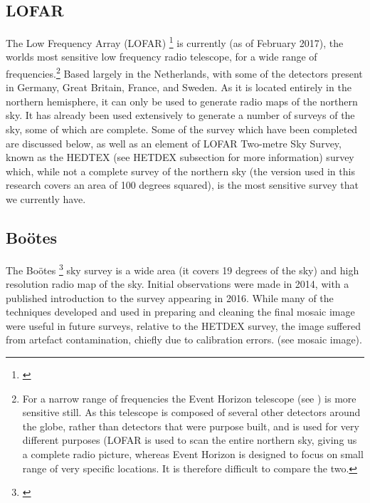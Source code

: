\documentclass{article}
\begin{document}
\subsection{LOFAR}
The Low Frequency Array (LOFAR) \footnote{\cite{lofarweb,lofararticle,lofaruk}} is currently (as of February 2017), the worlds most sensitive low frequency radio telescope, for a wide range of frequencies.\footnote{For a narrow range of frequencies the Event Horizon telescope (see \cite{eventhorizontelescope}) is more sensitive still. As this telescope is composed of several other detectors around the globe, rather than detectors that were purpose built, and is used for very different purposes (LOFAR is used to scan the entire northern sky, giving us a complete radio picture, whereas Event Horizon is designed to focus on small range of very specific locations. It is therefore difficult to compare the two.} Based largely in the Netherlands, with some of the detectors present in Germany, Great Britain, France, and Sweden. As it is located entirely in the northern hemisphere, it can only be used to generate radio maps of the northern sky. It has already been used extensively to generate a number of surveys of the sky, some of which are complete. Some of the survey which have been completed are discussed below, as well as an element of LOFAR Two-metre Sky Survey, known as the HEDTEX (see HETDEX subsection for more information) survey which, while not a complete survey of the northern sky (the version used in this research covers an area of 100 degrees squared), is the most sensitive survey that we currently have.


\subsection{Bo{\"o}tes}
The Bo{\"o}tes \footnote{\cite{bootes}} sky survey is a wide area (it covers 19 degrees of the sky) and high resolution radio map of the sky. Initial observations were made in 2014, with a published introduction to the survey appearing in 2016. While many of the techniques developed and used in preparing and cleaning the final mosaic image were useful in future surveys, relative to the HETDEX survey, the image suffered from artefact contamination, chiefly due to calibration errors. (see mosaic image).
\end{document}
